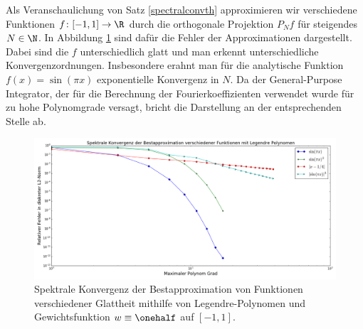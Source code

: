 \begin{mathbsp}
Als Veranschaulichung von Satz \ref{spectralconvth} approximieren wir verschiedene Funktionen $f\colon [-1,1]\to\R$ durch die orthogonale Projektion $P_Nf$ für steigendes $N\in\N$. In Abbildung \ref{figurespectralconverg} sind dafür die Fehler der Approximationen dargestellt. Dabei sind die $f$ unterschiedlich glatt und man erkennt unterschiedliche Konvergenzordnungen. Insbesondere erahnt man für die analytische Funktion $f(x)=\sin(\pi x)$ exponentielle Konvergenz in $N$. Da der General-Purpose Integrator, der für die Berechnung der Fourierkoeffizienten verwendet wurde für zu hohe Polynomgrade versagt, bricht die Darstellung an der entsprechenden Stelle ab.
\begin{figure}[h]
\includegraphics[width=\textwidth]{Figures/spectral_convergence_legendre.png}
\caption{Spektrale Konvergenz der Bestapproximation von Funktionen verschiedener Glattheit mithilfe von Legendre-Polynomen und Gewichtsfunktion $w\equiv \onehalf$ auf $[-1,1]$.}
\label{figurespectralconverg}
\end{figure}
\end{mathbsp}
